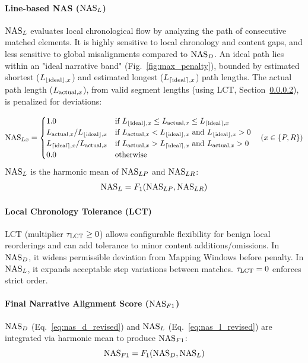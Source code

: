 \paragraph{Line-based NAS ($\text{NAS}_L$)} %
\label{sssec:nasl_revised} %
$\text{NAS}_L$ evaluates local chronological flow by analyzing the path of consecutive matched elements. It is highly sensitive to local chronology and content gaps, and less sensitive to global misalignments compared to $\text{NAS}_D$. An ideal path lies within an "ideal narrative band" (Fig.~\ref{fig:max_penalty}), bounded by estimated shortest ($L_{\lfloor\text{ideal}\rfloor,x}$) and estimated longest ($L_{\lceil\text{ideal}\rceil,x}$) path lengths. The actual path length ($L_{\text{actual},x}$), from valid segment lengths (using LCT, Section~\ref{sssec:lct_revised}), is penalized for deviations:

\begin{equation} \label{eq:nas_lx_revised}
\text{NAS}_{Lx} =
\begin{cases}
1.0 & \text{if } L_{\lfloor\text{ideal}\rfloor,x} \leq L_{\text{actual},x} \leq L_{\lceil\text{ideal}\rceil,x} \\
L_{\text{actual},x} / L_{\lfloor\text{ideal}\rfloor,x} & \text{if } L_{\text{actual},x} < L_{\lfloor\text{ideal}\rfloor,x} \text{ and } L_{\lfloor\text{ideal}\rfloor,x} > 0 \\
L_{\lceil\text{ideal}\rceil,x} / L_{\text{actual},x} & \text{if } L_{\text{actual},x} > L_{\lceil\text{ideal}\rceil,x} \text{ and } L_{\text{actual},x} > 0 \\
0.0 & \text{otherwise}
\end{cases}
\quad (x \in \{P, R\})
\end{equation}
$\text{NAS}_L$ is the harmonic mean of $\text{NAS}_{LP}$ and $\text{NAS}_{LR}$:
\begin{equation} \label{eq:nas_l_revised}
\text{NAS}_L = F_1(\text{NAS}_{LP}, \text{NAS}_{LR})
\end{equation}

\paragraph{Local Chronology Tolerance (LCT)} %
\label{sssec:lct_revised} %
LCT (multiplier $\tau_{\text{LCT}} \geq 0$) allows configurable flexibility for benign local reorderings and can add tolerance to minor content additions/omissions. In $\text{NAS}_D$, it widens permissible deviation from Mapping Windows before penalty. In $\text{NAS}_L$, it expands acceptable step variations between matches. $\tau_{\text{LCT}}=0$ enforces strict order.

\paragraph{Final Narrative Alignment Score ($\text{NAS}_{F1}$)} %
\label{sssec:nas_f1_revised} %
$\text{NAS}_D$ (Eq.~\ref{eq:nas_d_revised}) and $\text{NAS}_L$ (Eq.~\ref{eq:nas_l_revised}) are integrated via harmonic mean to produce $\text{NAS}_{F1}$:
\begin{equation} \label{eq:nas_f1_revised}
\text{NAS}_{F1} = F_1(\text{NAS}_D, \text{NAS}_L) 
\end{equation}

